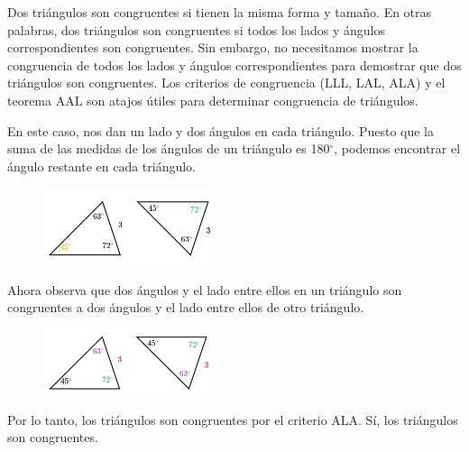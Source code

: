 \begin{solutionbox}{5cm}
    Dos triángulos son congruentes si tienen la misma forma y tamaño. En otras palabras, dos triángulos son congruentes si todos los lados y ángulos correspondientes son congruentes.
    Sin embargo, no necesitamos mostrar la congruencia de todos los lados y ángulos correspondientes para demostrar que dos triángulos son congruentes. Los criterios de congruencia (LLL, LAL, ALA) y el teorema AAL son atajos útiles para determinar congruencia de triángulos.

    En este caso, nos dan un lado y dos ángulos en cada triángulo.
    Puesto que la suma de las medidas de los ángulos de un triángulo es 180$^\circ$, podemos encontrar el ángulo restante en cada triángulo.

    \begin{figure}[H]
        \includegraphics[width=0.45\textwidth]{../images/20230323155725}
        \caption{}
        \label{fig:20230323155725}
    \end{figure}

    Ahora observa que dos ángulos y el lado entre ellos en un triángulo son congruentes a dos ángulos y el lado entre ellos de otro triángulo.

    \begin{figure}[H]
        \includegraphics[width=0.45\textwidth]{../images/20230323155732}
        \caption{}
        \label{fig:20230323155732}
    \end{figure}

    Por lo tanto, los triángulos son congruentes por el criterio ALA.
    Sí, los triángulos son congruentes.
\end{solutionbox}